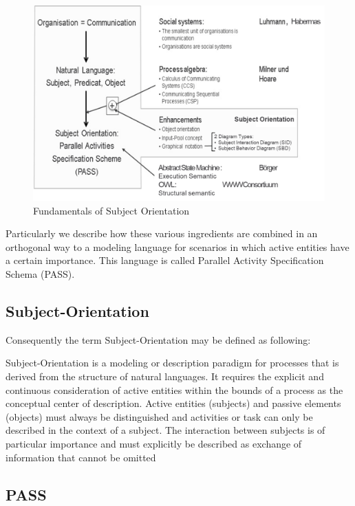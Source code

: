 \begin{figure} [ph!]
	\centering
	\includegraphics [width=1.0\linewidth]{Figures/fundamentals.png} 
	\caption{Fundamentals of Subject Orientation}
	\label{fig4}
\end{figure}

Particularly we describe how these various ingredients are combined in an orthogonal way to a modeling language for scenarios in which active entities have a certain importance. This language is called Parallel Activity Specification Schema (PASS).\\

\subsection{Subject-Orientation}

Consequently the term Subject-Orientation may be defined as following: 

Subject-Orientation is a modeling or description paradigm for processes that is derived from the structure of natural languages. It requires the explicit and continuous consideration of active entities within the bounds of a process as the conceptual center of description. Active entities (subjects) and passive elements (objects) must always be distinguished and activities or task can only be described in the context of a subject. The interaction between subjects is of particular importance and must explicitly be described as exchange of information that cannot be omitted \cite{elstermann:diss}

\subsection{PASS}

